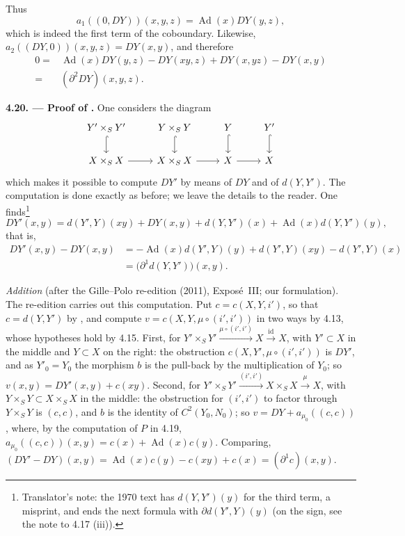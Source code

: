 \begin{center}
\end{center}

Thus
\[
 a_1((0,DY))(x,y,z)
 =\operatorname{Ad}(x)DY(y,z),
\]
which is indeed the first term of the coboundary. Likewise,
\(a_2((DY,0))(x,y,z)=DY(x,y)\), and therefore
\[
 \begin{aligned}
 0={}&\operatorname{Ad}(x)DY(y,z)-DY(xy,z)
      +DY(x,yz)-DY(x,y)\\
   ={}&(\partial^2DY)(x,y,z).
 \end{aligned}
\]

\medskip
\noindent{}\textbf{4.20. --- Proof of .}
One considers the diagram
\[
\begin{tikzcd}[column sep=2.4em]
 Y'\times_SY'\arrow[d,hook]&Y\times_SY\arrow[d,hook]&Y\arrow[d,hook]
  &Y'\arrow[d,hook]\\
 X\times_SX\arrow[r]&X\times_SX\arrow[r]&X\arrow[r]&X
\end{tikzcd}
\]
which makes it possible to compute \(DY'\) by means of \(DY\) and of
\(d(Y,Y')\). The computation is done exactly as before; we leave the
details to the reader. One finds\footnote{Translator's note: the 1970 text has \(d(Y,Y')(y)\) for
the third term, a misprint, and ends the next formula with
\(\partial d(Y',Y)(y)\) (on the sign, see the note to 4.17 (iii)).}
\[
 DY'(x,y)=d(Y',Y)(xy)+DY(x,y)+d(Y,Y')(x)+\operatorname{Ad}(x)d(Y,Y')(y),
\]
that is,
\[
 \begin{aligned}
 DY'(x,y)-DY(x,y)
 &=-\operatorname{Ad}(x)d(Y',Y)(y)+d(Y',Y)(xy)-d(Y',Y)(x)\\
 &=\bigl(\partial^1d(Y,Y')\bigr)(x,y).
 \end{aligned}
\]

\emph{Addition} (after the Gille--Polo re-edition (2011), Exposé~III; our
formulation). The re-edition carries out this computation. Put
\(c=c(X,Y,i')\), so that \(c=d(Y,Y')\) by , and compute
\(v=c(X,Y,\mu\circ(i',i'))\) in two ways by 4.13, whose hypotheses hold by
4.15. First, for \(Y'\times_SY'\xrightarrow{\mu\circ(i',i')}X
\xrightarrow{\mathrm{id}}X\), with \(Y'\subset X\) in the middle and \(Y\subset
X\) on the right: the obstruction \(c(X,Y',\mu\circ(i',i'))\) is \(DY'\), and as
\(Y'_0=Y_0\) the morphism \(b\) is the pull-back by the multiplication of
\(Y_0\); so \(v(x,y)=DY'(x,y)+c(xy)\). Second, for \(Y'\times_SY'
\xrightarrow{(i',i')}X\times_SX\xrightarrow{\mu}X\), with \(Y\times_SY\subset
X\times_SX\) in the middle: the obstruction for \((i',i')\) to factor through
\(Y\times_SY\) is \((c,c)\), and \(b\) is the identity of \(C^2(Y_0,N_0)\); so
\(v=DY+a_{\mu_0}((c,c))\), where, by the computation of \(P\) in 4.19,
\(a_{\mu_0}((c,c))(x,y)=c(x)+\operatorname{Ad}(x)c(y)\). Comparing,
\((DY'-DY)(x,y)=\operatorname{Ad}(x)c(y)-c(xy)+c(x)=(\partial^1c)(x,y)\).

